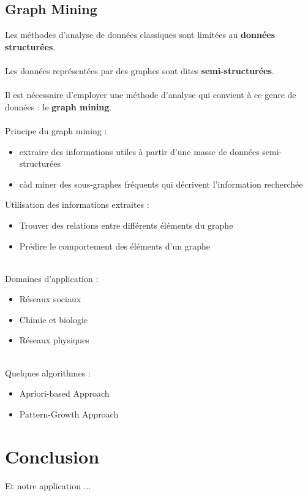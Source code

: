 	\subsection{Graph Mining}
	\begin{frame}
		Les méthodes d'analyse de données classiques sont limitées au \textbf{données structurées}.
		\\~\\
		\pause
		Les données représentées par des graphes sont dites \textbf{semi-structurées}.
		\\~\\
		\pause
		Il est nécessaire d'employer une méthode d'analyse qui convient à ce genre de données : le \textbf{graph mining}.
		\\~\\
		\pause
		Principe du graph mining :
		\begin{itemize} 
		\pause \item extraire des informations utiles à partir d'une masse de données semi-structurées
		\pause \item càd miner des sous-graphes fréquents qui décrivent l'information recherchée
		\end{itemize}
	\end{frame}
	\begin{frame}
		Utilisation des informations extraites :
		\begin{itemize}
			\pause \item Trouver des relations entre différents éléments du graphe
			\pause \item Prédire le comportement des éléments d'un graphe
		\end{itemize}
		~\\
		\pause
		Domaines d'application :
		\begin{itemize}
			\pause \item Réseaux sociaux
			\pause \item Chimie et biologie
			\pause \item Réseaux physiques
		\end{itemize}
		~\\
		\pause
		Quelques algorithmes :
		\begin{itemize}
			\pause \item Apriori-based Approach
			\pause \item Pattern-Growth Approach
		\end{itemize}
	\end{frame}
	
	\section{Conclusion}
	\begin{frame}
		Et notre application ...
	\end{frame}


